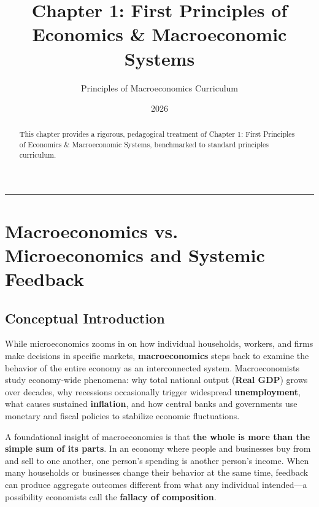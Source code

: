 \documentclass[11pt,letterpaper]{article}
\begin{document}
\title{\Huge\bfseries\color{SlateBlue} Chapter 1: First Principles of Economics \& Macroeconomic Systems}
\author{\large Principles of Macroeconomics Curriculum}
\date{2026}
\maketitle

\thispagestyle{plain}

\begin{abstract}
This chapter provides a rigorous, pedagogical treatment of Chapter 1: First Principles of Economics \& Macroeconomic Systems, benchmarked to standard principles curriculum.
\end{abstract}

\tableofcontents
\vspace{1.5em}
\hrule
\vspace{1.5em}

\section{Macroeconomics vs. Microeconomics and Systemic Feedback}

\subsection*{Conceptual Introduction}
While microeconomics zooms in on how individual households, workers, and firms make decisions in specific markets, \textbf{macroeconomics} steps back to examine the behavior of the entire economy as an interconnected system. Macroeconomists study economy-wide phenomena: why total national output (\textbf{Real GDP}) grows over decades, why recessions occasionally trigger widespread \textbf{unemployment}, what causes sustained \textbf{inflation}, and how central banks and governments use monetary and fiscal policies to stabilize economic fluctuations.

A foundational insight of macroeconomics is that \textbf{the whole is more than the simple sum of its parts}. In an economy where people and businesses buy from and sell to one another, one person's spending is another person's income. When many households or businesses change their behavior at the same time, feedback can produce aggregate outcomes different from what any individual intended—a possibility economists call the \textbf{fallacy of composition}.
\end{document}
